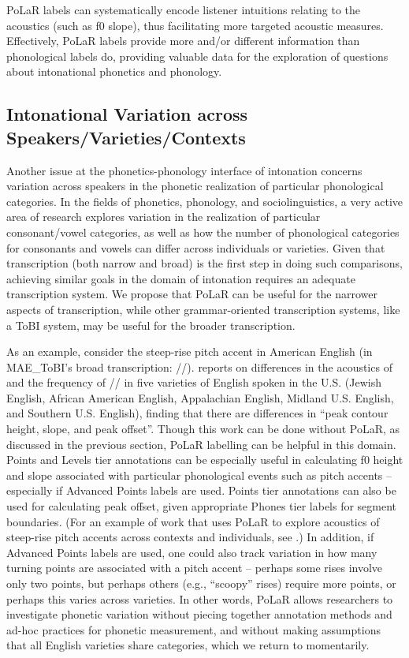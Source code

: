 PoLaR labels can systematically encode listener intuitions relating to the acoustics (such as f0 slope), thus facilitating more targeted acoustic measures. Effectively, PoLaR labels provide more and/or different information than phonological labels do, providing valuable data for the exploration of questions about intonational phonetics and phonology.

\subsection{Intonational Variation across Speakers\slash Varieties\slash Contexts}\label{sec:interspeaker-variation-in-realization-of-prosodic-categories}

Another issue at the phonetics-phonology interface of intonation concerns variation across speakers in the phonetic realization of particular phonological categories. In the fields of phonetics, phonology, and sociolinguistics, a very active area of research explores variation in the realization of particular consonant\slash vowel categories, as well as how the number of phonological categories for consonants and vowels can differ across individuals or varieties. Given that transcription (both narrow and broad) is the first step in doing such comparisons, achieving similar goals in the domain of intonation requires an adequate transcription system. We propose that PoLaR can be useful for the narrower aspects of transcription, while other grammar-oriented transcription systems, like a ToBI system, may be useful for the broader transcription.

As an example, consider the steep-rise pitch accent in American English (in MAE\_ToBI’s broad transcription: //). \citealt{burdin-18} reports on differences in the acoustics of and the frequency of // in five varieties of English spoken in the U.S. (Jewish English, African American English, Appalachian English, Midland U.S. English, and Southern U.S. English), finding that there are differences in “peak contour height, slope, and peak offset”. Though this work can be done without PoLaR, as discussed in the previous section, PoLaR labelling can be helpful in this domain. Points and Levels tier annotations can be especially useful in calculating f0 height and slope associated with particular phonological events such as pitch accents – especially if Advanced Points labels are used. Points tier annotations can also be used for calculating peak offset, given appropriate Phones tier labels for segment boundaries. (For an example of work that uses PoLaR to explore acoustics of steep-rise pitch accents across contexts and individuals, see \citealt{holliday21a}.)  In addition, if Advanced Points labels are used, one could also track variation in how many turning points are associated with a pitch accent – perhaps some rises involve only two points, but perhaps others (e.g., “scoopy” rises) require more points, or perhaps this varies across varieties. In other words, PoLaR allows researchers to investigate phonetic variation without piecing together annotation methods and ad-hoc practices for phonetic measurement, and without making assumptions that all English varieties share categories, which we return to momentarily.

